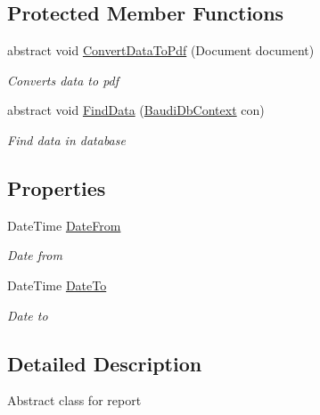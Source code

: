 \subsection*{Protected Member Functions}
\begin{DoxyCompactItemize}
\item 
abstract void \hyperlink{class_baudi_1_1_client_1_1_reports_1_1_report_a7439932063d4e578b7cf64377707c7af}{Convert\+Data\+To\+Pdf} (Document document)
\begin{DoxyCompactList}\small\item\em Converts data to pdf \end{DoxyCompactList}\item 
abstract void \hyperlink{class_baudi_1_1_client_1_1_reports_1_1_report_a321b93e358b8c0c2d86b4dc049a622d6}{Find\+Data} (\hyperlink{class_baudi_1_1_d_a_l_1_1_baudi_db_context}{Baudi\+Db\+Context} con)
\begin{DoxyCompactList}\small\item\em Find data in database \end{DoxyCompactList}\end{DoxyCompactItemize}
\subsection*{Properties}
\begin{DoxyCompactItemize}
\item 
Date\+Time \hyperlink{class_baudi_1_1_client_1_1_reports_1_1_report_ae4ecfcfe5f357e99a1ae36d762760b3e}{Date\+From}
\begin{DoxyCompactList}\small\item\em Date from \end{DoxyCompactList}\item 
Date\+Time \hyperlink{class_baudi_1_1_client_1_1_reports_1_1_report_a8c58ed65a345287730db36cc1a1e676b}{Date\+To}
\begin{DoxyCompactList}\small\item\em Date to \end{DoxyCompactList}\end{DoxyCompactItemize}


\subsection{Detailed Description}
Abstract class for report 



